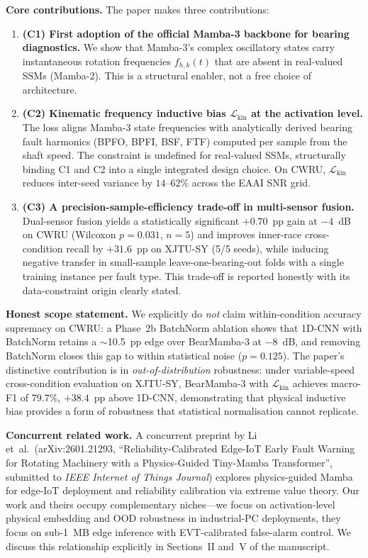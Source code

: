 \documentclass[11pt,a4paper]{article}
\begin{document}
\textbf{Core contributions.} The paper makes three contributions:
\begin{enumerate}
\item \textbf{(C1) First adoption of the official Mamba-3 backbone for
bearing diagnostics.} We show that Mamba-3's complex oscillatory states
carry instantaneous rotation frequencies $f_{h,k}(t)$ that are absent in
real-valued SSMs (Mamba-2). This is a structural enabler, not a free
choice of architecture.
\item \textbf{(C2) Kinematic frequency inductive bias $\mathcal{L}_{\text{kin}}$
at the activation level.} The loss aligns Mamba-3 state frequencies with
analytically derived bearing fault harmonics (BPFO, BPFI, BSF, FTF)
computed per sample from the shaft speed. The constraint is undefined
for real-valued SSMs, structurally binding C1 and C2 into a single
integrated design choice. On CWRU, $\mathcal{L}_{\text{kin}}$ reduces
inter-seed variance by $14$--$62\%$ across the EAAI SNR grid.
\item \textbf{(C3) A precision-sample-efficiency trade-off in
multi-sensor fusion.} Dual-sensor fusion yields a statistically
significant $+0.70$~pp gain at $-4$~dB on CWRU
(Wilcoxon $p = 0.031$, $n=5$) and improves inner-race cross-condition
recall by $+31.6$~pp on XJTU-SY (5/5 seeds), while inducing negative
transfer in small-sample leave-one-bearing-out folds with a single
training instance per fault type. This trade-off is reported honestly
with its data-constraint origin clearly stated.
\end{enumerate}

\textbf{Honest scope statement.} We explicitly do \emph{not} claim
within-condition accuracy supremacy on CWRU: a Phase~2b BatchNorm
ablation shows that 1D-CNN with BatchNorm retains a $\sim$10.5~pp edge
over BearMamba-3 at $-8$~dB, and removing BatchNorm closes this gap to
within statistical noise ($p = 0.125$). The paper's distinctive
contribution is in \emph{out-of-distribution} robustness: under
variable-speed cross-condition evaluation on XJTU-SY, BearMamba-3 with
$\mathcal{L}_{\text{kin}}$ achieves macro-F1 of $79.7\%$, $+38.4$~pp
above 1D-CNN, demonstrating that physical inductive bias provides a
form of robustness that statistical normalisation cannot replicate.

\textbf{Concurrent related work.} A concurrent preprint by Li et~al.\
(arXiv:2601.21293, ``Reliability-Calibrated Edge-IoT Early Fault Warning
for Rotating Machinery with a Physics-Guided Tiny-Mamba Transformer'',
submitted to \textit{IEEE Internet of Things Journal}) explores
physics-guided Mamba for edge-IoT deployment and reliability calibration
via extreme value theory. Our work and theirs occupy complementary
niches---we focus on activation-level physical embedding and OOD
robustness in industrial-PC deployments, they focus on sub-1~MB edge
inference with EVT-calibrated false-alarm control. We discuss this
relationship explicitly in Sections~II and~V of the manuscript.
\end{document}
